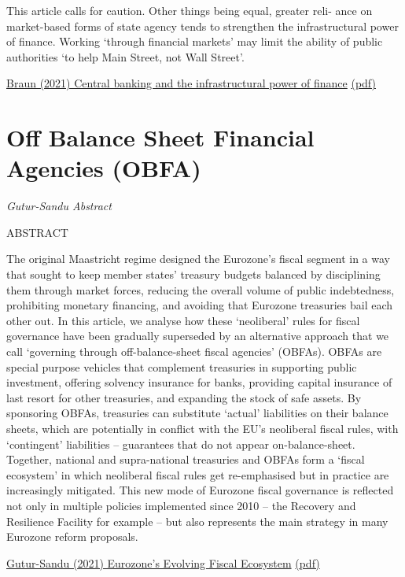 \documentclass[
]{book}
\begin{document}
This article calls for caution. Other things being equal, greater reli-
ance on market-based forms of state agency tends to strengthen the infrastructural power of
finance. Working `through financial markets' may limit the ability of public authorities `to
help Main Street, not Wall Street'.

\href{https://academic.oup.com/ser/article/18/2/395/4883362}{Braun (2021) Central banking and the infrastructural power of finance}
\href{pdf/Braun_2021_Central_Banking_and_Infrastructural_Power_of_Finance.pdf}{(pdf)}

\hypertarget{off-balance-sheet-financial-agencies-obfa}{%
\chapter{Off Balance Sheet Financial Agencies (OBFA)}\label{off-balance-sheet-financial-agencies-obfa}}

\emph{Gutur-Sandu Abstract}

ABSTRACT

The original Maastricht regime designed the Eurozone's fiscal segment in a way that sought to keep member states' treasury budgets balanced by disciplining them through market forces, reducing the overall volume of public indebtedness, prohibiting monetary financing, and avoiding that Eurozone treasuries bail each other out. In this article, we analyse how these `neoliberal' rules for fiscal governance have been gradually superseded by an alternative approach that we call `governing through off-balance-sheet fiscal agencies' (OBFAs). OBFAs are special purpose vehicles that complement treasuries in supporting public investment, offering solvency insurance for banks, providing capital insurance of last resort for other treasuries, and expanding the stock of safe assets. By sponsoring OBFAs, treasuries can substitute `actual' liabilities on their balance sheets, which are potentially in conflict with the EU's neoliberal fiscal rules, with `contingent' liabilities -- guarantees that do not appear on-balance-sheet. Together, national and supra-national treasuries and OBFAs form a `fiscal ecosystem' in which neoliberal fiscal rules get re-emphasised but in practice are increasingly mitigated. This new mode of Eurozone fiscal governance is reflected not only in multiple policies implemented since 2010 -- the Recovery and Resilience Facility for example -- but also represents the main strategy in many Eurozone reform proposals.

\href{https://www.tandfonline.com/doi/full/10.1080/13563467.2021.1910648}{Gutur-Sandu (2021) Eurozone's Evolving Fiscal Ecosystem}
\href{pdf/Gutur-Sandu_2021_Eurozones_evolving_Fiscal_Ecosystem.pdf}{(pdf)}
\end{document}
